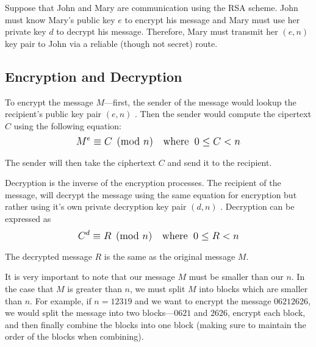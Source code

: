 Suppose that John and Mary are communication using the RSA scheme. John must know Mary's public key $e$ to encrypt his message and Mary must use her private key $d$ to 
decrypt his message. Therefore, Mary must transmit her $(e,n)$ key pair to John via a reliable (though not secret) route. 

\subsection{Encryption and Decryption}

To encrypt the message $M$---first, the sender of the message would lookup the recipient's public key pair $(e,n)$ \cite{classical_algebra}. 
Then the sender would compute the cipertext $C$ using the following equation: 
$$\mathlarger{M^e \equiv C \pmod{n} \text{\hspace{1em}where\;\;}0 \leq C < n}$$

The sender will then take the ciphertext $C$ and send it to the recipient.

Decryption is the inverse of the encryption processes. The recipient of the message, will decrypt the message using the same equation for encryption but rather using it's
own private decryption key pair $(d,n)$ \cite{classical_algebra}. Decryption can be expressed as 
$$\mathlarger{C^d \equiv R \pmod{n} \text{\hspace{1em}where\;\;}0 \leq R < n}$$

The decrypted message $R$ is the same as the original message $M$.

It is very important to note that our message $M$ must be smaller than our $n$. In the case that $M$ is greater than $n$, we must split $M$ into blocks which are smaller
than $n$. For example, if $n=12319$ and we want to encrypt the message $06212626$, we would split the message into two blocks---$0621$ and $2626$, encrypt each block, 
and then finally combine the blocks into one block (making sure to maintain the order of the blocks when combining).
